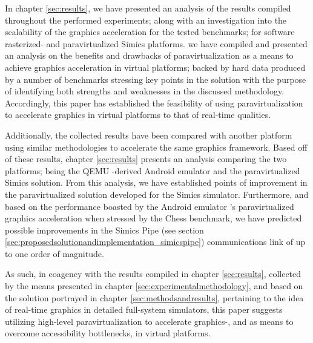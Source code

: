 In chapter \ref{sec:results}, we have presented an analysis of the results compiled throughout the performed experiments; along with an investigation into the scalability of the graphics acceleration for the tested benchmarks; for software rasterized- and paravirtualized Simics platforms.
we have compiled and presented an analysis on the benefits and drawbacks of paravirtualization as a means to achieve graphics acceleration in virtual platforms; backed by hard data produced by a number of benchmarks stressing key points in the solution with the purpose of identifying both strengths and weaknesses in the discussed methodology.
Accordingly, this paper has established the feasibility of using paravirtualization to accelerate graphics in virtual platforms to that of real-time qualities.

Additionally, the collected results have been compared with another platform using similar methodologies to accelerate the same graphics framework.
Based off of these results, chapter \ref{sec:results} presents an analysis comparing the two platforms; being the QEMU -derived Android emulator and the paravirtualized Simics solution.
From this analysis, we have established points of improvement in the paravirtualized solution developed for the Simics simulator.
Furthermore, and based on the performance boasted by the Android emulator 's paravirtualized graphics acceleration when stressed by the Chess benchmark, we have predicted possible improvements in the Simics Pipe (see section \ref{sec:proposedsolutionandimplementation_simicspipe}) communications link of up to one order of magnitude.

As such, in coagency with the results compiled in chapter \ref{sec:results}, collected by the means presented in chapter \ref{sec:experimentalmethodology}, and based on the solution portrayed in chapter \ref{sec:methodsandresults}, pertaining to the idea of real-time graphics in detailed full-system simulators, this paper suggests utilizing high-level paravirtualization to accelerate graphics-, and as means to overcome accessibility bottlenecks, in virtual platforms.
